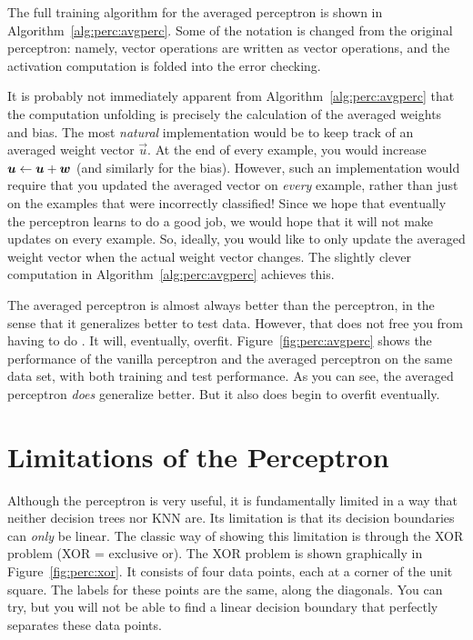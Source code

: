 The full training algorithm for the averaged perceptron is shown in
Algorithm~\ref{alg:perc:avgperc}.  Some of the notation is changed
from the original perceptron: namely, vector operations are written as
vector operations, and the activation computation is folded into the
error checking.

It is probably not immediately apparent from
Algorithm~\ref{alg:perc:avgperc} that the computation unfolding is
precisely the calculation of the averaged weights and bias.  The most
\emph{natural} implementation would be to keep track of an averaged
weight vector $\vec u$.  At the end of every example, you would
increase $\boldsymbol{u} \leftarrow \boldsymbol{u} + {\boldsymbol{w}}$ (and similarly for the
bias).  However, such an implementation would require that you updated
the averaged vector on \emph{every} example, rather than just on the
examples that were incorrectly classified!  Since we hope that
eventually the perceptron learns to do a good job, we would hope that
it will not make updates on every example.  So, ideally, you would
like to only update the averaged weight vector when the actual weight
vector changes.  The slightly clever computation in
Algorithm~\ref{alg:perc:avgperc} achieves this.



The averaged perceptron is almost always better than the perceptron,
in the sense that it generalizes better to test data.  However, that
does not free you from having to do .  It
will, eventually, overfit.  Figure~\ref{fig:perc:avgperc} shows the
performance of the vanilla perceptron and the averaged perceptron on
the same data set, with both training and test performance.  As you
can see, the averaged perceptron \emph{does} generalize better.  But
it also does begin to overfit eventually.

\section{Limitations of the Perceptron}


Although the perceptron is very useful, it is fundamentally limited in
a way that neither decision trees nor KNN are.  Its limitation is that
its decision boundaries can \emph{only} be linear.  The classic way of
showing this limitation is through the XOR problem (XOR = exclusive
or).  The XOR problem is shown graphically in
Figure~\ref{fig:perc:xor}.  It consists of four data points, each at a
corner of the unit square.  The labels for these points are the same,
along the diagonals.  You can try, but you will not be able to find a
linear decision boundary that perfectly separates these data points.

